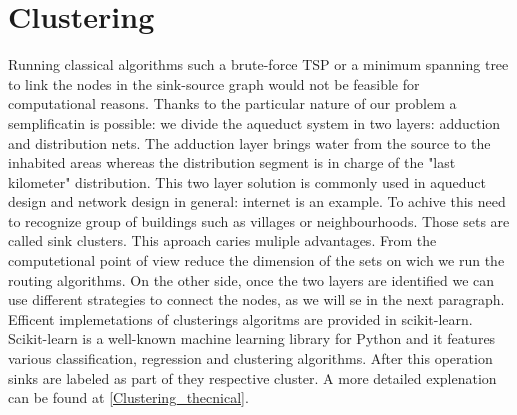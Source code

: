 \section {Clustering}

Running classical algorithms such a brute-force TSP or a minimum spanning tree to link
the nodes in the sink-source graph would not be feasible for computational reasons. 
Thanks to the particular nature of our problem a semplificatin is possible: we divide the aqueduct system
in two layers: adduction and distribution nets. The adduction layer brings water from the
source to the inhabited areas whereas the distribution segment is in charge of the "last
kilometer" distribution. This two layer solution is commonly used in aqueduct design and
network design in general: internet is an example.
To achive this need to recognize group of buildings such as villages or neighbourhoods. Those sets are called sink clusters.
This aproach caries muliple advantages. From the computetional point of view reduce the dimension of the sets on wich we run the routing algorithms.  On the other side, once the two layers are identified we can use different strategies to connect the nodes, as we will se in the next paragraph.
Efficent implemetations of clusterings algoritms are provided in scikit-learn. Scikit-learn is a well-known
machine learning library for Python and it features various classification, regression and
clustering algorithms. After this operation sinks are labeled as part of they respective cluster. A more detailed explenation can be found at \ref {Clustering_thecnical}.

